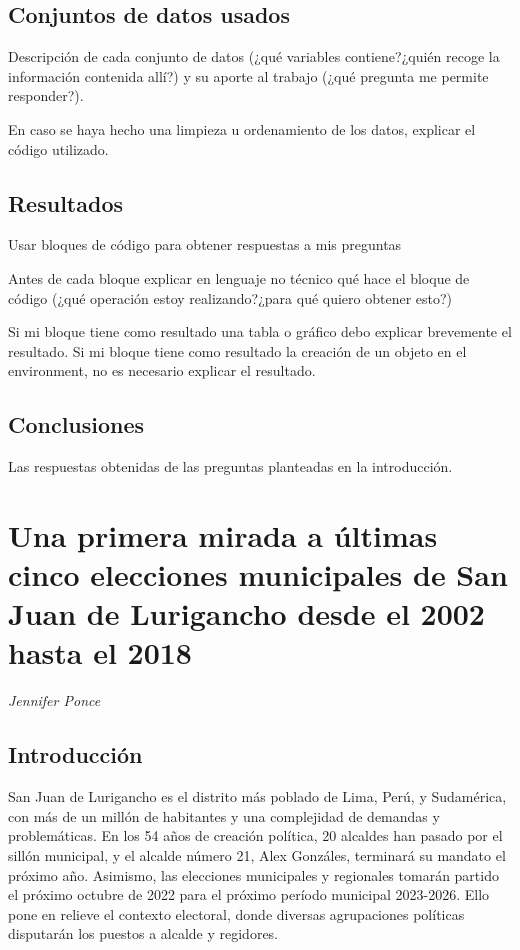 \documentclass[
]{book}
\begin{document}
\hypertarget{conjuntos-de-datos-usados-1}{%
\section{Conjuntos de datos usados}\label{conjuntos-de-datos-usados-1}}

Descripción de cada conjunto de datos (¿qué variables contiene?¿quién recoge la información contenida allí?) y su aporte al trabajo (¿qué pregunta me permite responder?).

En caso se haya hecho una limpieza u ordenamiento de los datos, explicar el código utilizado.

\hypertarget{resultados-1}{%
\section{Resultados}\label{resultados-1}}

Usar bloques de código para obtener respuestas a mis preguntas

Antes de cada bloque explicar en lenguaje no técnico qué hace el bloque de código (¿qué operación estoy realizando?¿para qué quiero obtener esto?)

Si mi bloque tiene como resultado una tabla o gráfico debo explicar brevemente el resultado. Si mi bloque tiene como resultado la creación de un objeto en el environment, no es necesario explicar el resultado.

\hypertarget{conclusiones-1}{%
\section{Conclusiones}\label{conclusiones-1}}

Las respuestas obtenidas de las preguntas planteadas en la introducción.

\hypertarget{eleccionesSJL}{%
\chapter{Una primera mirada a últimas cinco elecciones municipales de San Juan de Lurigancho desde el 2002 hasta el 2018}\label{eleccionesSJL}}

\emph{Jennifer Ponce}

\hypertarget{introducciuxf3n-2}{%
\section{Introducción}\label{introducciuxf3n-2}}

San Juan de Lurigancho es el distrito más poblado de Lima, Perú, y Sudamérica, con más de un millón de habitantes y una complejidad de demandas y problemáticas. En los 54 años de creación política, 20 alcaldes han pasado por el sillón municipal, y el alcalde número 21, Alex Gonzáles, terminará su mandato el próximo año. Asimismo, las elecciones municipales y regionales tomarán partido el próximo octubre de 2022 para el próximo período municipal 2023-2026. Ello pone en relieve el contexto electoral, donde diversas agrupaciones políticas disputarán los puestos a alcalde y regidores.
\end{document}
